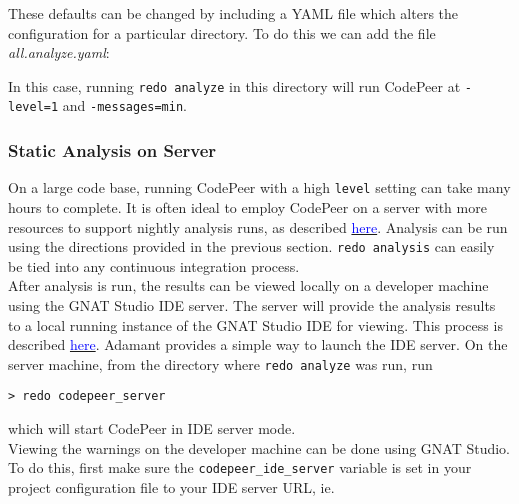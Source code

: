These defaults can be changed by including a YAML file which alters the configuration for a particular directory. To do this we can add the file \textit{all.analyze.yaml}:


In this case, running \texttt{redo analyze} in this directory will run CodePeer at \texttt{-level=1} and \texttt{-messages=min}.

\subsubsection{Static Analysis on Server}

On a large code base, running CodePeer with a high \texttt{level} setting can take many hours to complete. It is often ideal to employ CodePeer on a server with more resources to support nightly analysis runs, as described \href{https://docs.adacore.com/codepeer-docs/users_guide/_build/html/workflows.html#nightly-runs-on-a-server}{\textcolor{blue}{here}}. Analysis can be run using the directions provided in the previous section. \texttt{redo analysis} can easily be tied into any continuous integration process. \\

After analysis is run, the results can be viewed locally on a developer machine using the GNAT Studio IDE server. The server will provide the analysis results to a local running instance of the GNAT Studio IDE for viewing. This process is described \href{https://docs.adacore.com/codepeer-docs/users_guide/_build/html/viewing_output.html#accessing-results-remotely-ide}{\textcolor{blue}{here}}. Adamant provides a simple way to launch the IDE server. On the server machine, from the directory where \texttt{redo analyze} was run, run

\vspace{5mm} %
\begin{verbatim}
> redo codepeer_server
\end{verbatim}
\vspace{5mm} %

which will start CodePeer in IDE server mode. \\

Viewing the warnings on the developer machine can be done using GNAT Studio. To do this, first make sure the \texttt{codepeer\_ide\_server} variable is set in your project configuration file to your IDE server URL, ie. 

